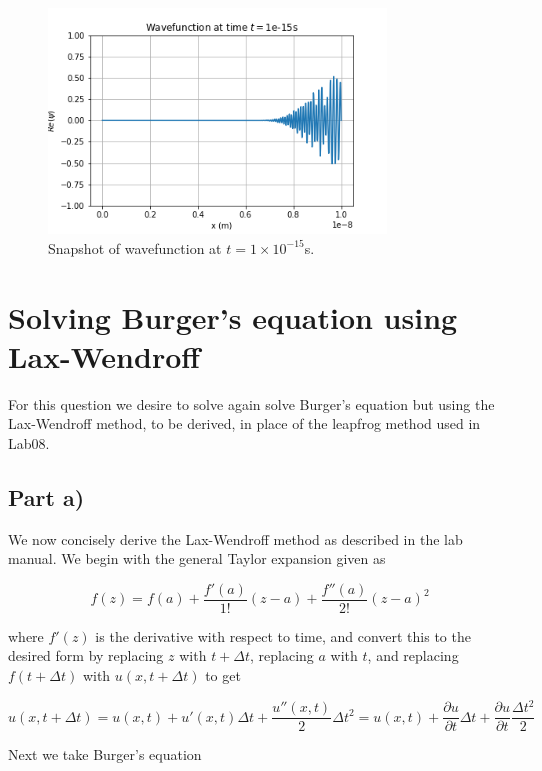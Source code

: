 \documentclass{article}
\begin{document}
\begin{figure}[H]
	\centering
	\includegraphics[width=0.8\textwidth]{../images/q2_t=1e-15.png}
	\caption{Snapshot of wavefunction at $t=1\times 10^{-15}$s.}
	\label{fig:q2_t=1e-15}
\end{figure}


\section{Solving Burger's equation using Lax-Wendroff}
For this question we desire to solve again solve Burger's equation but using the Lax-Wendroff method, to be derived, in place of the leapfrog method used in Lab08.

\subsection{Part a)}
We now concisely derive the Lax-Wendroff method as described in the lab manual. We begin with the general Taylor expansion given as 

\begin{equation}
	f(z) = f(a) + \frac{f'(a)}{1!}(z-a) + \frac{f''(a)}{2!}(z-a)^2
\end{equation}

where $f'(z)$ is the derivative with respect to time, and convert this to the desired form by replacing $z$ with $t+\Delta t$, replacing $a$ with $t$, and replacing $f(t+\Delta t)$ with $u(x, t+\Delta t)$ to get

\begin{equation}
	\label{eq:t-exp}
	u(x,t+\Delta t) = u(x,t) + u'(x,t)\Delta t + \frac{u''(x,t)}{2}\Delta t^2
	= u(x,t) + \frac{\partial u}{\partial t}\Delta t + \frac{\partial u}{\partial t}\frac{\Delta t^2}{2}
\end{equation}

Next we take Burger's equation
\end{document}
